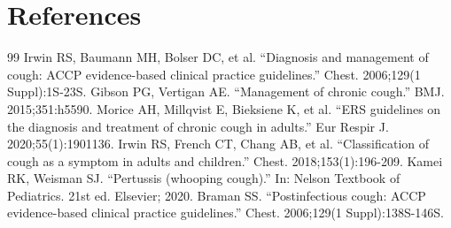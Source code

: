 \section*{References}
\begin{thebibliography}{99}
 Irwin RS, Baumann MH, Bolser DC, et al. ``Diagnosis and management of cough: ACCP evidence-based clinical practice guidelines.'' Chest. 2006;129(1 Suppl):1S-23S.
 Gibson PG, Vertigan AE. ``Management of chronic cough.'' BMJ. 2015;351:h5590.
 Morice AH, Millqvist E, Bieksiene K, et al. ``ERS guidelines on the diagnosis and treatment of chronic cough in adults.'' Eur Respir J. 2020;55(1):1901136.
 Irwin RS, French CT, Chang AB, et al. ``Classification of cough as a symptom in adults and children.'' Chest. 2018;153(1):196-209.
 Kamei RK, Weisman SJ. ``Pertussis (whooping cough).'' In: Nelson Textbook of Pediatrics. 21st ed. Elsevier; 2020.
 Braman SS. ``Postinfectious cough: ACCP evidence-based clinical practice guidelines.'' Chest. 2006;129(1 Suppl):138S-146S.
\end{thebibliography}
